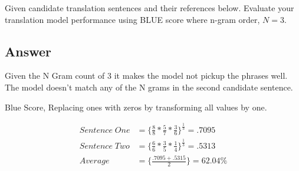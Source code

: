 Given candidate translation sentences and their references below. 
Evaluate your translation model performance using BLUE score where n-gram order, $N=3$.
\subsection{Answer}
Given the N Gram count of 3 it makes the model not pickup the phrases well.
The model doesn't match any of the N grams in the second candidate sentence.

\begin{center}
	Blue Score, Replacing ones with zeros by transforming all values by one.
\end{center}

\begin{align*}
	Sentence\;One &= \bigg\{
	\frac{8}{8}*
	\frac{5}{7}*
	\frac{3}{6}
		\bigg\}^{\frac{1}{3}}
	=.7095
	\\
	Sentence\;Two &= \bigg\{ 
	\frac{6}{6}*
	\frac{3}{5}*
	\frac{1}{4}
	\bigg\}^{\frac{1}{3}}
	=.5313
	\\
	Average &= \bigg\{
		\frac
		{.7095 + .5315}
		{2}
		\bigg\}
		= 62.04\%
\end{align*}
\pagebreak
